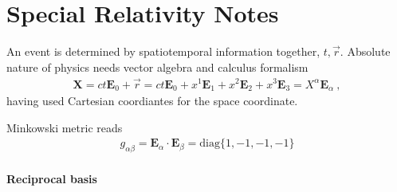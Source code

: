 \documentclass[letterpaper,10pt,english]{jupyterBook}
\begin{document}
\sphinxstepscope


\chapter{Special Relativity \sphinxhyphen{} Notes}
\label{\detokenize{ch/relativity-special/notes:special-relativity-notes}}\label{\detokenize{ch/relativity-special/notes:relativity-special-notes}}\label{\detokenize{ch/relativity-special/notes::doc}}
\sphinxAtStartPar
An event is determined by spatio\sphinxhyphen{}temporal information together, \(t, \vec{r}\). Absolute nature of physics needs vector algebra and calculus formalism
\begin{equation*}
\begin{split}\mathbf{X} = c  t  \mathbf{E}_0 + \vec{r} =  c  t  \mathbf{E}_0 + x^1 \mathbf{E}_1 + x^2 \mathbf{E}_2 + x^3 \mathbf{E}_3 = X^{\alpha} \mathbf{E}_{\alpha} \ ,\end{split}
\end{equation*}
\sphinxAtStartPar
having used Cartesian coordiantes for the space coordinate.

\sphinxAtStartPar
{} Minkowski metric reads
\begin{equation*}
\begin{split}g_{\alpha \beta} = \mathbf{E}_{\alpha} \cdot \mathbf{E}_{\beta} = \text{diag}\{1, -1, -1, -1\}\end{split}
\end{equation*}\subsubsection*{Reciprocal basis}
\end{document}
